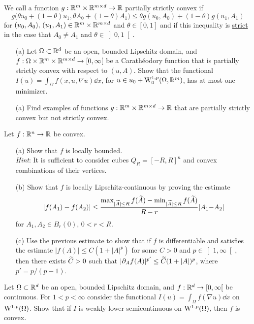 \documentclass[12pt,a4paper]{article}
\begin{document}

\setcounter{AUFGABE}{29}

 We call a function $g:{\mathbb R}^m\times {\mathbb R}^{m\times d}\to {\mathbb R} $ partially strictly convex if 
\[
g\big(\theta u_0+(1{-}\theta)u_1,\theta A_0+(1{-}\theta)A_1\big)
\leq \theta g(u_0,A_0) + (1{-}\theta)g(u_1,A_1)
\]
for $(u_0,A_0),\,(u_1,A_1)\in{\mathbb R}^m\times{\mathbb R}^{m\times d}$ and $\theta\in[0,1]$
and if this inequality is \underline{strict} in the case that $A_0\neq A_1$ and $\theta\in\left]0,1\right[$.

\begin{itemize}
\item[(a)] Let $\Omega\subset {\mathbb R}^d$ be an open, bounded Lipschitz domain, and
 $f:\Omega\times{\mathbb R}^m\times{\mathbb R}^{m\times d}\to[0,\infty[$ be a Carath\'eodory function that is partially strictly convex with respect to $(u,A)$. Show that
 the functional $I(u)= \int_\Omega f(x,u,\nabla u)\dd x$, for $u\in u_0 + {\mathrm W}^{1,p}_0(\Omega,{\mathbb R}^m)$, has at most one minimizer.
 \item[(a)] Find examples of functions $g:{\mathbb R}^m\times {\mathbb R}^{m\times d}\to {\mathbb R} $ that are partially strictly convex but not strictly convex.
\end{itemize}

 Let $f:{\mathbb R}^n\to {\mathbb R}$ be convex.
\begin{itemize}
\item[(a)] Show that $f$ is locally bounded. \\
\emph{Hint}: It is sufficient to consider cubes $Q_R=[{-}R,R]^n$ and convex combinations of their vertices.
\item[(b)] Show that $f$ is locally Lipschitz-continuous by proving the estimate
\[
|f(A_1)-f(A_2)| \leq \frac{\max_{|\widetilde A|\leq R} f(\widetilde A) - \min_{|\widetilde A|\leq R}f(\widetilde A)}{R-r}|A_1{-}A_2|
\]
for $A_1,A_2\in B_r(0)$, $0<r<R$.
\item[(c)] Use the previous estimate to show that if $f$ is differentiable and satisfies the  estimate $|f(A)|\leq C(1+|A|^p)$ for some $C>0$ and $p\in\left]1,
\infty\right[$, then there exists $\widetilde C>0$ such that $|\partial_A f(A)|^{p'}\leq \widetilde C(1+|A|)^p$,
where $p'=p/(p-1)$.
\end{itemize}


Let $\Omega\subset{\mathbb R}^d$ be an open, bounded Lipschitz domain, and
$f:{\mathbb R}^d\to[0,\infty[$ be continuous. For $1<p<\infty$ consider the functional
$I(u)=\int_\Omega f(\nabla u)\dd x$ on ${\mathrm W}^{1,p}(\Omega)$. 
Show that 
if $I$ is weakly lower semicontinuous on ${\mathrm W}^{1,p}(\Omega)$, then $f$ is convex.
\end{document}
